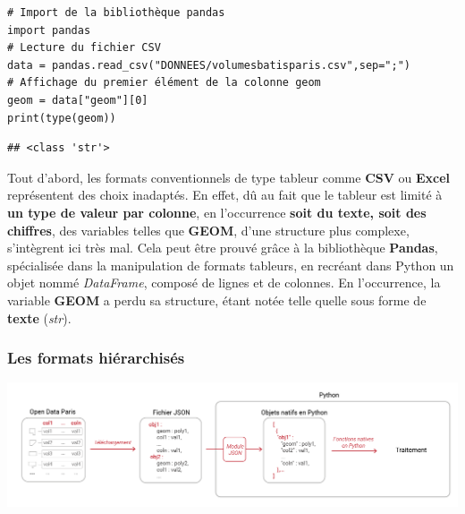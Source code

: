 \documentclass[
  11pt,
  french,
]{article}
\newcounter{customfigs}[section]
\newenvironment{customfigs}[1][] {
    \stepcounter{customfigs}
    Fig \arabic{section}. \arabic{customfigs} : }
\newcommand{\masked}{\vspace*{-\baselineskip}}
\begin{document}
\begin{tcolorbox}[title= Format CSV ,colback=boitecode]
\begin{lstlisting}[style=code]
# Import de la bibliothèque pandas
import pandas
# Lecture du fichier CSV
data = pandas.read_csv("DONNEES/volumesbatisparis.csv",sep=";")
# Affichage du premier élément de la colonne geom
geom = data["geom"][0]
print(type(geom))\end{lstlisting}
\begin{lstlisting}[style=out]
## <class 'str'>
\end{lstlisting}
\end{tcolorbox}

Tout d'abord, les formats conventionnels de type tableur comme
\textbf{CSV} ou \textbf{Excel} représentent des choix inadaptés. En
effet, dû au fait que le tableur est limité à \textbf{un type de valeur
par colonne}, en l'occurrence \textbf{soit du texte, soit des chiffres},
des variables telles que \textbf{GEOM}, d'une structure plus complexe,
s'intègrent ici très mal. Cela peut être prouvé grâce à la bibliothèque
\textbf{Pandas}, spécialisée dans la manipulation de formats tableurs,
en recréant dans Python un objet nommé \emph{DataFrame}, composé de
lignes et de colonnes. En l'occurrence, la variable \textbf{GEOM} a
perdu sa structure, étant notée telle quelle sous forme de
\textbf{texte} (\emph{str}).

\newpage

\hypertarget{les-formats-hiuxe9rarchisuxe9s}{%
\subsubsection{Les formats
hiérarchisés}\label{les-formats-hiuxe9rarchisuxe9s}}

\begin{tcolorbox}[title=\begin{customfigs} Chargement du jeu de données sous un format hiérarchisé dans Python \end{customfigs}]

\begin{center}\includegraphics[width=1\linewidth]{__imgs/io_json} \end{center}

\end{tcolorbox}
\end{document}
